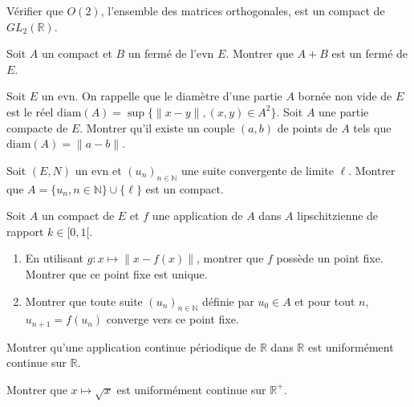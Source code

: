 \begin{exercice}
Vérifier que $O(2)$, l'ensemble des matrices orthogonales, est un compact de $GL_{2}(\mathbb{R})$.
\end{exercice}

\begin{exercice}
Soit $A$ un compact et $B$ un fermé de l'evn $E$.
Montrer que $A+B$ est un fermé de $E$.
\end{exercice}

\begin{exercice}
Soit $E$ un evn. On rappelle que le diamètre d'une partie $A$ bornée non vide de $E$ est le réel $\text{diam}(A) = \sup \{ \|x-y\|, (x,y) \in A^{2} \}$.
Soit $A$ une partie compacte de $E$. Montrer qu'il existe un couple $(a,b)$ de points de $A$ tels que $\text{diam}(A) = \|a-b\|$.
\end{exercice}

\begin{exercice}
Soit $(E, N)$ un evn et $(u_{n})_{n \in \mathbb{N}}$ une suite convergente de limite $\ell$.
Montrer que $A = \{u_{n}, n \in \mathbb{N}\} \cup \{\ell\}$ est un compact.
\end{exercice}

\begin{exercice}
Soit $A$ un compact de $E$ et $f$ une application de $A$ dans $A$ lipschitzienne de rapport $k \in [0,1[$.
\begin{enumerate}
    \item En utilisant $g : x \mapsto \|x-f(x)\|$, montrer que $f$ possède un point fixe. Montrer que ce point fixe est unique.
    \item Montrer que toute suite $(u_{n})_{n \in \mathbb{N}}$ définie par $u_{0} \in A$ et pour tout $n$, $u_{n+1}=f(u_{n})$ converge vers ce point fixe.
\end{enumerate}
\end{exercice}

\begin{exercice}
Montrer qu'une application continue périodique de $\mathbb{R}$ dans $\mathbb{R}$ est uniformément continue sur $\mathbb{R}$.
\end{exercice}

\begin{exercice}
Montrer que $x \mapsto \sqrt{x}$ est uniformément continue sur $\mathbb{R}^{+}$.
\end{exercice}

